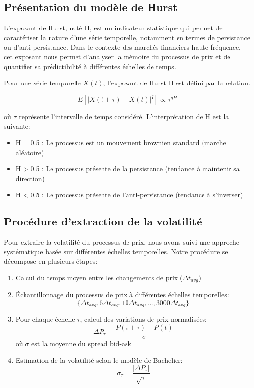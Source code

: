 \documentclass[10pt,a4paper]{article}
\theoremstyle{definition}
\theoremstyle{remark}
\begin{document}
\begin{itemize}
\subsection{Présentation du modèle de Hurst}

L'exposant de Hurst, noté H, est un indicateur statistique qui permet de caractériser la nature d'une série temporelle, notamment en termes de persistance ou d'anti-persistance. Dans le contexte des marchés financiers haute fréquence, cet exposant nous permet d'analyser la mémoire du processus de prix et de quantifier sa prédictibilité à différentes échelles de temps.

Pour une série temporelle \(X(t)\), l'exposant de Hurst H est défini par la relation:

\[
E[|X(t+\tau) - X(t)|^q] \propto \tau^{qH}
\]

où \(\tau\) représente l'intervalle de temps considéré. L'interprétation de H est la suivante:
\begin{itemize}
    \item H = 0.5 : Le processus est un mouvement brownien standard (marche aléatoire)
    \item H > 0.5 : Le processus présente de la persistance (tendance à maintenir sa direction)
    \item H < 0.5 : Le processus présente de l'anti-persistance (tendance à s'inverser)
\end{itemize}

\subsection{Procédure d'extraction de la volatilité}

Pour extraire la volatilité du processus de prix, nous avons suivi une approche systématique basée sur différentes échelles temporelles. Notre procédure se décompose en plusieurs étapes:

\begin{enumerate}
    \item Calcul du temps moyen entre les changements de prix (\(\Delta t_{avg}\))
    \item Échantillonnage du processus de prix à différentes échelles temporelles:
    \[\{\Delta t_{avg}, 5\Delta t_{avg}, 10\Delta t_{avg}, ..., 3000\Delta t_{avg}\}\]
    \item Pour chaque échelle \(\tau\), calcul des variations de prix normalisées:
    \[\Delta P_{\tau} = \frac{P(t+\tau) - P(t)}{\sigma}\]
    où \(\sigma\) est la moyenne du spread bid-ask
    \item Estimation de la volatilité selon le modèle de Bachelier:
    \[\sigma_{\tau} = \frac{|\Delta P_{\tau}|}{\sqrt{\tau}}\]
\end{enumerate}


\end{itemize}
\end{document}
